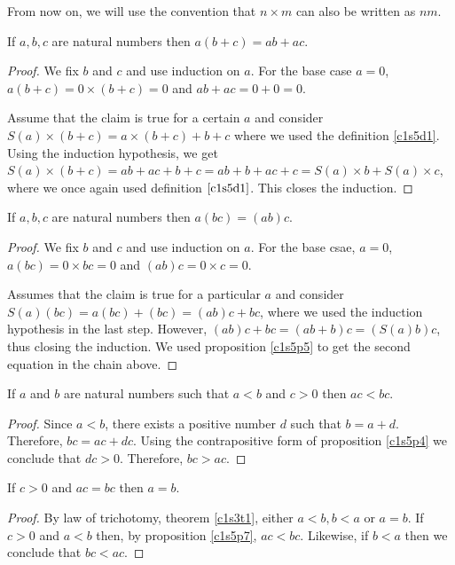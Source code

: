 From now on, we will use the convention that $n \times m$ can also be
written as $nm$.

\begin{prop}\label{c1s5p5}
If $a, b, c$ are natural numbers then $a(b + c) = ab + ac$.
\end{prop}
\begin{proof}
We fix $b$ and $c$ and use induction on $a$. For the base case $a = 0$, 
$a(b + c) = 0 \times (b + c) = 0$ and $ab + ac = 0 + 0 = 0$.

Assume that the claim is true for a certain $a$ and consider $S(a) \times
(b + c) = a \times (b + c) + b + c$ where we used the definition 
\ref{c1s5d1}. Using the induction hypothesis, we get $S(a) \times (b + c) =
ab + ac + b + c = ab + b + ac + c = S(a) \times b + S(a) \times c$, where
we once again used definition $\ref{c1s5d1}$. This closes the induction.
\end{proof}

\begin{prop}\label{c1s5p6}
If $a, b, c$ are natural numbers then $a(bc) = (ab)c$.
\end{prop}
\begin{proof}
We fix $b$ and $c$ and use induction on $a$. For the base csae, $a = 0$,
$a(bc) = 0 \times bc = 0$ and $(ab)c = 0 \times c = 0$.

Assumes that the claim is true for a particular $a$ and consider $S(a)(bc)
= a(bc) + (bc) = (ab)c + bc$, where we used the induction hypothesis in the
last step. However, $(ab)c + bc = (ab + b)c = (S(a)b)c$, thus closing the
induction. We used proposition \ref{c1s5p5} to get the second equation in 
the chain above.
\end{proof}

\begin{prop}\label{c1s5p7}
If $a$ and $b$ are natural numbers such that $a < b$ and $c > 0$ then
$ac < bc$.
\end{prop}
\begin{proof}
Since $a < b$, there exists a positive number $d$ such that $b = a + d$.
Therefore, $bc = ac + dc$. Using the contrapositive form of proposition
\ref{c1s5p4} we conclude that $dc > 0$. Therefore, $bc > ac$.
\end{proof}

\begin{prop}\label{c1s5p8}
If $c > 0$ and $ac = bc$ then $a = b$.
\end{prop}
\begin{proof}
By law of trichotomy, theorem \ref{c1s3t1}, either $a < b, b < a$ or $a = 
b$. If $c > 0$ and $a < b$ then, by proposition \ref{c1s5p7}, $ac < bc$.
Likewise, if $b < a$ then we conclude that $bc < ac$. 
\end{proof}

